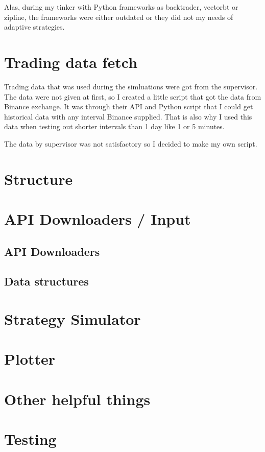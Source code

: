 Alas, during my tinker with Python frameworks as backtrader, vectorbt or zipline, the frameworks were either outdated or they did not my needs of adaptive strategies.

\section{Trading data fetch}
Trading data that was used during the simluations were got from the supervisor. The data were not given at first, so I created a little script that got the data from Binance exchange. It was through their API and Python script that I could get historical data with any interval Binance supplied. That is also why I used this data when testing out shorter intervals than 1 day like 1 or 5 minutes.

The data by supervisor was not satisfactory so I decided to make my own script.

\section{Structure}

\section{API Downloaders / Input}

\subsection*{API Downloaders}

\subsection*{Data structures}

\section{Strategy Simulator}

\section{Plotter}

\section{Other helpful things}

\section{Testing}

